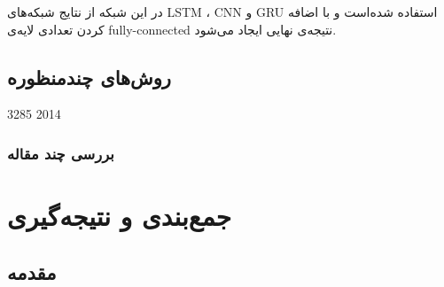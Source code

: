 \documentclass[12pt, a4paper, oneside]{report}
\begin{document}
در این شبکه از نتایج شبکه‌های
LSTM
،
CNN
و 
GRU
استفاده شده‌است و با اضافه کردن تعدادی لایه‌ی
fully-connected
نتیجه‌ی نهایی ایجاد می‌شود.

\section{ روش‌های چندمنظوره }

\cite{kalchbrenner-etal-2014-convolutional} 3285 2014

\subsection{بررسی چند مقاله}


\chapter{جمع‌بندی و نتیجه‌گیری}
\pagebreak
\section{مقدمه}

\begin{latin}
    
\end{latin}
\end{document}
